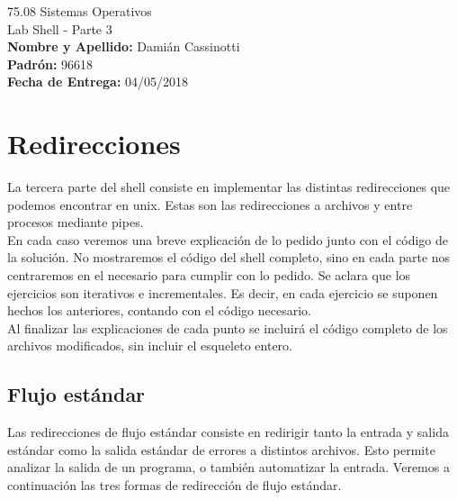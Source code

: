 \documentclass[a4paper, 12pt]{article}
\begin{document}
		
	\begin{titlepage}
		\vspace*{\fill}
		\begin{center}
			\Large 75.08 Sistemas Operativos \\
			\Huge Lab Shell - Parte 3 \\
			\bigskip\bigskip\bigskip
			\large\textbf{Nombre y Apellido:} Damián Cassinotti \\
			\textbf{Padrón:} 96618 \\
			\textbf{Fecha de Entrega:} 04/05/2018\\
					
		\end{center}
		\vspace*{\fill}
	\end{titlepage}
	\newpage
			
	\tableofcontents
	\newpage
	
	\section{Redirecciones}
		La tercera parte del shell consiste en implementar las distintas redirecciones que podemos encontrar en unix. Estas son las redirecciones a archivos y entre procesos mediante pipes.\\
		
		En cada caso veremos una breve explicación de lo pedido junto con el código de la solución. No mostraremos el código del shell completo, sino en cada parte nos centraremos en el necesario para cumplir con lo pedido. Se aclara que los ejercicios son iterativos e incrementales. Es decir, en cada ejercicio se suponen hechos los anteriores, contando con el código necesario.\\
		
		Al finalizar las explicaciones de cada punto se incluirá el código completo de los archivos modificados, sin incluir el esqueleto entero.
		\subsection{Flujo estándar}
		Las redirecciones de flujo estándar consiste en redirigir tanto la entrada y salida estándar como la salida estándar de errores a distintos archivos. Esto permite analizar la salida de un programa, o también automatizar la entrada. Veremos a continuación las tres formas de redirección de flujo estándar.
		
\end{document}
